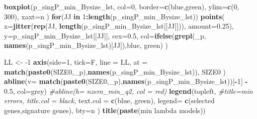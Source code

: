\documentclass[
]{book}
\newenvironment{Shaded}{\begin{snugshade}}{\end{snugshade}}
\newcommand{\CommentTok}[1]{\textcolor[rgb]{0.56,0.35,0.01}{\textit{#1}}}
\newcommand{\ControlFlowTok}[1]{\textcolor[rgb]{0.13,0.29,0.53}{\textbf{#1}}}
\newcommand{\DataTypeTok}[1]{\textcolor[rgb]{0.13,0.29,0.53}{#1}}
\newcommand{\DecValTok}[1]{\textcolor[rgb]{0.00,0.00,0.81}{#1}}
\newcommand{\FloatTok}[1]{\textcolor[rgb]{0.00,0.00,0.81}{#1}}
\newcommand{\KeywordTok}[1]{\textcolor[rgb]{0.13,0.29,0.53}{\textbf{#1}}}
\newcommand{\NormalTok}[1]{#1}
\newcommand{\OperatorTok}[1]{\textcolor[rgb]{0.81,0.36,0.00}{\textbf{#1}}}
\newcommand{\StringTok}[1]{\textcolor[rgb]{0.31,0.60,0.02}{#1}}
\begin{document}
\begin{Shaded}
\begin{Highlighting}[]
\KeywordTok{boxplot}\NormalTok{(p\_singP\_min\_Bysize\_lst,}
  \DataTypeTok{col=}\DecValTok{0}\NormalTok{,}
  \DataTypeTok{border=}\KeywordTok{c}\NormalTok{(}\StringTok{\textquotesingle{}blue\textquotesingle{}}\NormalTok{,}\StringTok{\textquotesingle{}green\textquotesingle{}}\NormalTok{),}
  \DataTypeTok{ylim=}\KeywordTok{c}\NormalTok{(}\DecValTok{0}\NormalTok{, }\DecValTok{300}\NormalTok{),}
  \DataTypeTok{xaxt=}\StringTok{\textquotesingle{}n\textquotesingle{}}
\NormalTok{)}
\ControlFlowTok{for}\NormalTok{(JJ }\ControlFlowTok{in} \DecValTok{1}\OperatorTok{:}\KeywordTok{length}\NormalTok{(p\_singP\_min\_Bysize\_lst))}
\KeywordTok{points}\NormalTok{(}
   \DataTypeTok{x=}\KeywordTok{jitter}\NormalTok{(}\KeywordTok{rep}\NormalTok{(JJ, }\KeywordTok{length}\NormalTok{(p\_singP\_min\_Bysize\_lst[[JJ]])), }\DataTypeTok{amount=}\FloatTok{0.25}\NormalTok{),}
   \DataTypeTok{y=}\NormalTok{p\_singP\_min\_Bysize\_lst[[JJ]], }\DataTypeTok{cex=}\FloatTok{0.5}\NormalTok{,}
   \DataTypeTok{col=}\KeywordTok{ifelse}\NormalTok{(}\KeywordTok{grepl}\NormalTok{(}\StringTok{\textquotesingle{}\_p\textquotesingle{}}\NormalTok{, }\KeywordTok{names}\NormalTok{(p\_singP\_min\_Bysize\_lst)[JJ]),}\StringTok{\textquotesingle{}blue\textquotesingle{}}\NormalTok{, }\StringTok{\textquotesingle{}green\textquotesingle{}}\NormalTok{)}
\NormalTok{)}

\NormalTok{LL <{-}}\StringTok{ }\DecValTok{{-}1}
\KeywordTok{axis}\NormalTok{(}\DataTypeTok{side=}\DecValTok{1}\NormalTok{, }\DataTypeTok{tick=}\NormalTok{F, }\DataTypeTok{line =}\NormalTok{ LL,}
  \DataTypeTok{at =} \KeywordTok{match}\NormalTok{(}\KeywordTok{paste0}\NormalTok{(SIZE0,}\StringTok{\textquotesingle{}\_p\textquotesingle{}}\NormalTok{),}\KeywordTok{names}\NormalTok{(p\_singP\_min\_Bysize\_lst)),}
\NormalTok{  SIZE0}
\NormalTok{ )}
\KeywordTok{abline}\NormalTok{(}\DataTypeTok{v=} \KeywordTok{match}\NormalTok{(}\KeywordTok{paste0}\NormalTok{(SIZE0,}\StringTok{\textquotesingle{}\_p\textquotesingle{}}\NormalTok{),}\KeywordTok{names}\NormalTok{(p\_singP\_min\_Bysize\_lst))[}\OperatorTok{{-}}\DecValTok{1}\NormalTok{] }\OperatorTok{{-}}\StringTok{ }\FloatTok{0.5}\NormalTok{, }\DataTypeTok{col=}\StringTok{\textquotesingle{}grey\textquotesingle{}}\NormalTok{)}
\CommentTok{\#abline(h= nzero\_min\_q2, col = \textquotesingle{}red\textquotesingle{})}
\KeywordTok{legend}\NormalTok{(}\StringTok{\textquotesingle{}topleft\textquotesingle{}}\NormalTok{,}
   \CommentTok{\#title=\textquotesingle{}min errors\textquotesingle{}, title.col = \textquotesingle{}black\textquotesingle{},}
   \DataTypeTok{text.col =} \KeywordTok{c}\NormalTok{(}\StringTok{\textquotesingle{}blue\textquotesingle{}}\NormalTok{, }\StringTok{\textquotesingle{}green\textquotesingle{}}\NormalTok{),}
   \DataTypeTok{legend=} \KeywordTok{c}\NormalTok{(}\StringTok{\textquotesingle{}selected genes\textquotesingle{}}\NormalTok{,}\StringTok{\textquotesingle{}signature genes\textquotesingle{}}\NormalTok{),}
   \DataTypeTok{bty=}\StringTok{\textquotesingle{}n\textquotesingle{}}
\NormalTok{ )}
\KeywordTok{title}\NormalTok{(}\KeywordTok{paste}\NormalTok{(}\StringTok{\textquotesingle{}min lambda models\textquotesingle{}}\NormalTok{))}


\end{Highlighting}
\end{Shaded}
\end{document}
